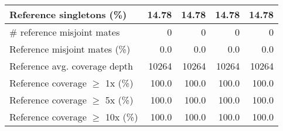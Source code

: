 \documentclass[12pt,a4paper]{article}
\begin{document}
\begin{table}[ht]
\begin{center}
\begin{tabular}{|l*{4}{|r}|}
Reference singletons (\%) & 14.78 & 14.78 & 14.78 & 14.78 \\ \hline
\# reference misjoint mates & 0 & 0 & 0 & 0 \\ \hline
Reference misjoint mates (\%) & 0.0 & 0.0 & 0.0 & 0.0 \\ \hline
Reference avg. coverage depth & 10264 & 10264 & 10264 & 10264 \\ \hline
Reference coverage $\geq$ 1x (\%) & 100.0 & 100.0 & 100.0 & 100.0 \\ \hline
Reference coverage $\geq$ 5x (\%) & 100.0 & 100.0 & 100.0 & 100.0 \\ \hline
Reference coverage $\geq$ 10x (\%) & 100.0 & 100.0 & 100.0 & 100.0 \\ \hline
\end{tabular}
\end{center}
\end{table}
\end{document}

